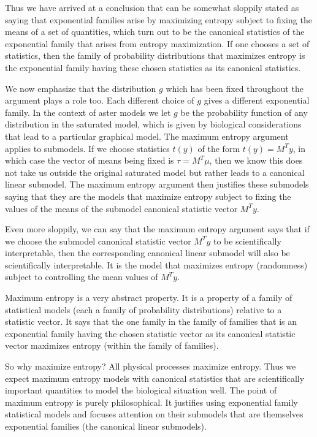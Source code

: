 \documentclass[11pt]{article}
\begin{document}
Thus we have arrived at a conclusion that can be somewhat sloppily stated
as saying that exponential families arise by maximizing entropy subject to
fixing the means of a set of quantities, which turn out to be the canonical
statistics of the exponential family that arises from entropy maximization.
If one chooses a set of statistics, then the family of probability
distributions that maximizes entropy is the exponential family having
these chosen statistics as its canonical statistics.

We now emphasize that the distribution $g$ which has been fixed throughout
the argument plays a role too.  Each different choice of $g$ gives a different
exponential family.  In the context of aster models we let $g$ be
the probability function of any distribution in the saturated
model, which is given by biological considerations that lead to a particular
graphical model.  The maximum entropy argument applies to submodels.
If we choose statistics $t(y)$ of the form $t(y) = M^T y$, in which case
the vector of means being fixed is $\tau = M^T \mu$,
then we know this does not take us outside the original saturated model
but rather leads to a canonical linear submodel.  The maximum entropy
argument then justifies these submodels saying that they are the models
that maximize entropy subject to fixing the values of the means
of the submodel canonical statistic vector $M^T y$.

Even more sloppily, we can say that the maximum entropy argument says that
if we choose the submodel canonical statistic vector $M^T y$ to be
scientifically interpretable, then the corresponding canonical linear submodel
will also be scientifically interpretable.  It is the model that maximizes
entropy (randomness) subject to controlling the mean values of $M^T y$.

Maximum entropy is a very abstract property.  It is a property of a family of
statistical models (each a family of probability distributions) relative to
a statistic vector.  It says that the one family in the family of families
that is an exponential family having the chosen statistic vector as its
canonical statistic vector maximizes entropy (within the family of families).

So why maximize entropy?
All physical processes maximize entropy.
Thus we expect maximum entropy models with canonical statistics that are
scientifically important quantities to model the biological situation well.
The point of maximum entropy is purely philosophical.  It justifies
using exponential family statistical models and focuses attention on their
submodels that are themselves exponential families (the canonical linear
submodels).
\end{document}

